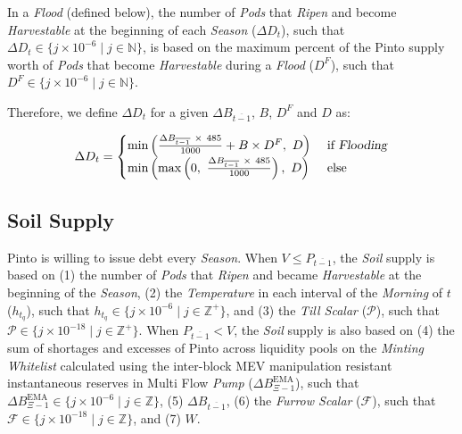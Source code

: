 \documentclass[tikz]{article}
\newcommand{\term}[1]{\textsl{#1}}
\begin{document}
\newpage

In a \term{Flood} (defined below), the number of \term{Pods} that \term{Ripen} and become \term{Harvestable} at the beginning of each \term{Season} ($\Delta D_{t}$), such that $\Delta D_{t} \in \{j \times 10^{-6} \mid j \in \mathbb{N} \}$, is based on the maximum percent of the Pinto supply worth of \term{Pods} that become \term{Harvestable} during a \term{Flood} ($D^{F}$), such that $D^{F} \in \{j \times 10^{-6} \mid j \in \mathbb{N} \}$.

Therefore, we define $\Delta D_{t}$ for a given $\Delta B_{\overline{t-1}}$, $B$, $D^{F}$ and $D$ as:

    $$
        \Delta D_{t} =
            \begin{cases}
               {\text{min}\left(
                    \frac{\Delta B_{\overline{t-1}}\ \times\ 485}
                            {1000} + B \times D^{F},\ 
                        D\right)}\
                    & \text{if } \term{Flooding} \\

               {\text{min}\left(
                    \text{max}\left
                        (0,\ 
                        \frac{\Delta B_{\overline{t-1}}\ \times\ 485}
                                {1000}\right),\ 
                            D\right)}
                    & \text{else }   
            \end{cases}
    $$


\subsection{Soil Supply}

Pinto is willing to issue debt every \term{Season}. When $V \leq P_{\overline{t-1}}$, the \term{Soil} supply is based on (1) the number of \term{Pods} that \term{Ripen} and became \term{Harvestable} at the beginning of the \term{Season}, (2) the \term{Temperature} in each interval of the \term{Morning} of $t$ ($h_{t_{q}}$), such that $h_{t_{q}} \in \{j \times 10^{-6} \mid j \in \mathbb{Z}^{+} \}$, and (3) the \term{Till Scalar} ($\mathscr{P}$), such that $\mathscr{P} \in \{j \times 10^{-18} \mid j \in \mathbb{Z}^{+} \}$. When $P_{\overline{t-1}} < V$, the \term{Soil} supply is also based on (4) the sum of shortages and excesses of Pinto across liquidity pools on the \term{Minting Whitelist} calculated using the inter-block MEV manipulation resistant instantaneous reserves in Multi Flow \term{Pump} ($\Delta B_{\Xi-1}^{\text{EMA}}$), such that $\Delta B_{\Xi-1}^{\text{EMA}} \in \{j \times 10^{-6} \mid j \in \mathbb{Z} \}$, (5) $\Delta B_{\overline{t-1}}$, (6) the \term{Furrow Scalar} ($\mathscr{F}$), such that $\mathscr{F} \in \{j \times 10^{-18} \mid j \in \mathbb{Z} \}$, and (7) $W$.
\end{document}

